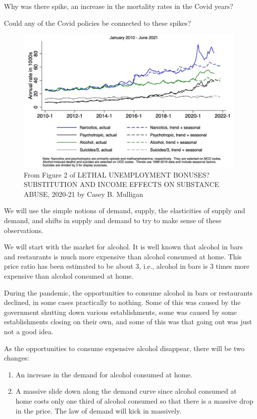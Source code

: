 \documentclass[
]{book}
\providecommand{\tightlist}{%
  \setlength{\itemsep}{0pt}\setlength{\parskip}{0pt}}
\begin{document}
Why was there spike, an increase in the mortality rates in the Covid years?

Could any of the Covid policies be connected to these spikes?

\begin{figure}

{\centering \includegraphics[width=0.75\linewidth]{img/demand/drugalcoholsuicidedeaths} 

}

\caption{From Figure 2 of LETHAL UNEMPLOYMENT BONUSES? SUBSTITUTION AND INCOME EFFECTS ON SUBSTANCE ABUSE, 2020-21 by Casey B. Mulligan}\label{fig:drugalcoholsuicidedeaths}
\end{figure}

We will use the simple notions of demand, supply, the elasticities of supply and demand, and shifts in supply and demand to try to make sense of these observations.

We will start with the market for alcohol. It is well known that alcohol in bars and restaurants is much more expensive than alcohol consumed at home. This price ratio has been estimated to be about 3, i.e., alcohol in bars is 3 times more expensive than alcohol consumed at home.

During the pandemic, the opportunities to consume alcohol in bars or restaurants declined, in some cases practically to nothing. Some of this was caused by the government shutting down various establishments, some was caused by some establishments closing on their own, and some of this was that going out was just not a good idea.

As the opportunities to consume expensive alcohol disappear, there will be two changes:

\begin{enumerate}
\def\labelenumi{\arabic{enumi}.}
\tightlist
\item
  An increase in the demand for alcohol consumed at home.
\item
  A massive slide down along the demand curve since alcohol consumed at home costs only one third of alcohol consumed so that there is a massive drop in the price. The law of demand will kick in massively.
\end{enumerate}
\end{document}
